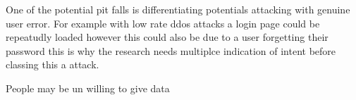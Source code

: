 One of the potential pit falls is differentiating potentials attacking with genuine user error. For example with low rate ddos attacks a login page could be repeatudly loaded however this could also be due to a user forgetting their password this is why the research needs multiplce indication of intent before classing this a attack.  

People may be un willing to give data

